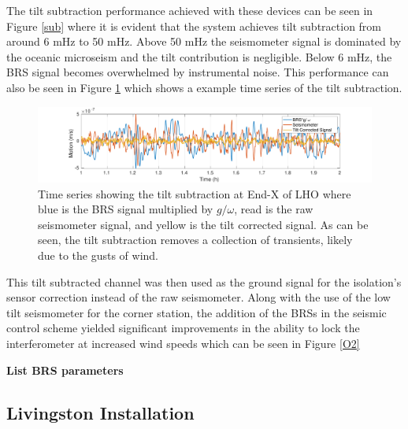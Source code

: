 \documentclass [12pt, proquest]{uwthesis}[2019]
\begin{document}
The tilt subtraction performance achieved with these devices can be seen in Figure \ref{sub} where it is evident that the system achieves tilt subtraction from around 6 mHz to 50 mHz. Above 50 mHz the seismometer signal is dominated by the oceanic microseism and the tilt contribution is negligible. Below 6 mHz, the BRS signal becomes overwhelmed by instrumental noise. This performance can also be seen in Figure \ref{subTime} which shows a example time series of the tilt subtraction. 

\begin{figure}%
\begin{center}
\includegraphics[width=\textwidth]{TiltCorrTime.pdf}
\caption{Time series showing the tilt subtraction at End-X of LHO where blue is the BRS signal multiplied by $g/\omega$, read is the raw seismometer signal, and yellow is the tilt corrected signal. As can be seen, the tilt subtraction removes a collection of transients, likely due to the gusts of wind.}
\label{subTime}
\end{center}
\end{figure}

This tilt subtracted channel was then used as the ground signal for the isolation's sensor correction instead of the raw seismometer. Along with the use of the low tilt seismometer for the corner station, the addition of the BRSs in the seismic control scheme yielded significant improvements in the ability to lock the interferometer at increased wind speeds which can be seen in Figure \ref{O2}

\textbf{List BRS parameters}


\subsection{Livingston Installation}
\end{document}
